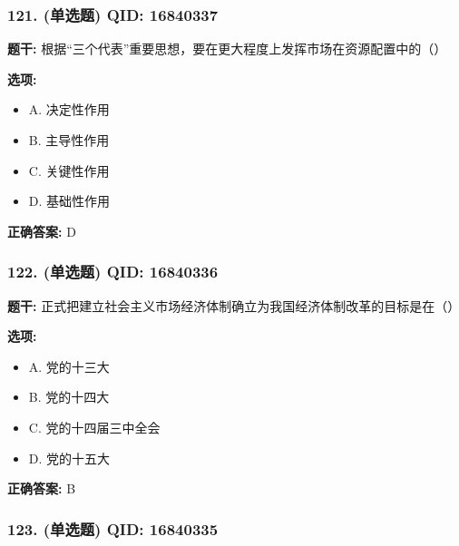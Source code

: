 \documentclass[12pt,UTF8]{ctexart}
\begin{document}
\subsubsection*{121. (单选题) \small QID: 16840337}

\textbf{题干:}
根据“三个代表”重要思想，要在更大程度上发挥市场在资源配置中的（）

\textbf{选项:}
\begin{itemize}[leftmargin=*]

  \item A. 决定性作用

  \item B. 主导性作用

  \item C. 关键性作用

  \item D. 基础性作用

\end{itemize}

\textbf{正确答案:}
D

\vspace{0.3em}\hrulefill\vspace{0.7em}

\subsubsection*{122. (单选题) \small QID: 16840336}

\textbf{题干:}
正式把建立社会主义市场经济体制确立为我国经济体制改革的目标是在（）

\textbf{选项:}
\begin{itemize}[leftmargin=*]

  \item A. 党的十三大

  \item B. 党的十四大

  \item C. 党的十四届三中全会

  \item D. 党的十五大

\end{itemize}

\textbf{正确答案:}
B

\vspace{0.3em}\hrulefill\vspace{0.7em}

\subsubsection*{123. (单选题) \small QID: 16840335}
\end{document}
